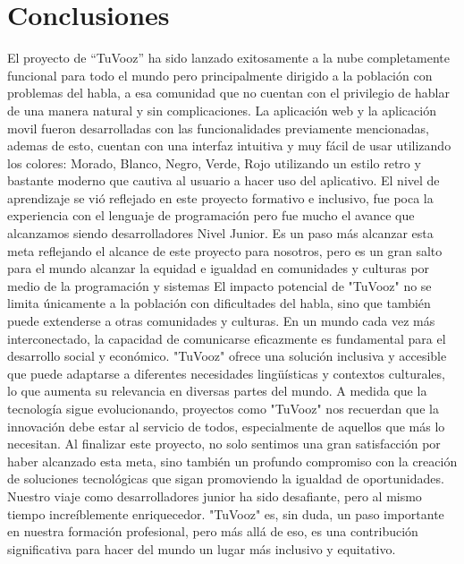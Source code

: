 \documentclass[12pt, a4paper, twocolumn]{article}
\begin{document}
\section{Conclusiones}
El proyecto de “TuVooz” ha sido lanzado exitosamente a la nube completamente funcional para todo el mundo pero principalmente dirigido a la población con problemas del habla, a esa comunidad que no cuentan con el privilegio de hablar de una manera natural y sin complicaciones. La aplicación web y la aplicación movil fueron desarrolladas con las funcionalidades previamente mencionadas, ademas de esto, cuentan con una interfaz intuitiva y muy fácil de usar utilizando los colores: Morado, Blanco, Negro, Verde, Rojo utilizando un estilo retro y bastante moderno que cautiva al usuario a hacer uso del aplicativo.
El nivel de aprendizaje se vió reflejado en este proyecto formativo e inclusivo, fue poca la experiencia con el lenguaje de programación pero fue mucho el avance que alcanzamos siendo desarrolladores Nivel Junior. Es un paso más alcanzar esta meta reflejando el alcance de este proyecto para nosotros, pero es un gran salto para el mundo alcanzar la equidad e igualdad en comunidades y culturas por medio de la programación y sistemas 
El impacto potencial de "TuVooz" no se limita únicamente a la población con dificultades del habla, sino que también puede extenderse a otras comunidades y culturas. En un mundo cada vez más interconectado, la capacidad de comunicarse eficazmente es fundamental para el desarrollo social y económico. "TuVooz" ofrece una solución inclusiva y accesible que puede adaptarse a diferentes necesidades lingüísticas y contextos culturales, lo que aumenta su relevancia en diversas partes del mundo. A medida que la tecnología sigue evolucionando, proyectos como "TuVooz" nos recuerdan que la innovación debe estar al servicio de todos, especialmente de aquellos que más lo necesitan.
Al finalizar este proyecto, no solo sentimos una gran satisfacción por haber alcanzado esta meta, sino también un profundo compromiso con la creación de soluciones tecnológicas que sigan promoviendo la igualdad de oportunidades. Nuestro viaje como desarrolladores junior ha sido desafiante, pero al mismo tiempo increíblemente enriquecedor. "TuVooz" es, sin duda, un paso importante en nuestra formación profesional, pero más allá de eso, es una contribución significativa para hacer del mundo un lugar más inclusivo y equitativo.
\end{document}
